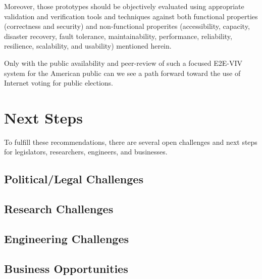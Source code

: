 Moreover, those prototypes should be objectively evaluated using
appropriate validation and verification tools and techniques against
both functional properties (correctness and security) and
non-functional properites (accessibility, capacity, disaster recovery,
fault tolerance, maintainability, performance, reliability,
resilience, scalability, and usability) mentioned herein.

Only with the public availability and peer-review of such a focused
E2E-VIV system for the American public can we see a path forward
toward the use of Internet voting for public elections.

\section{Next Steps}
\label{sec:next-steps}

To fulfill these recommendations, there are several open challenges
and next steps for legislators, researchers, engineers, and
businesses.

\subsection{Political/Legal Challenges}
\subsection{Research Challenges}
\subsection{Engineering Challenges}
\subsection{Business Opportunities}
